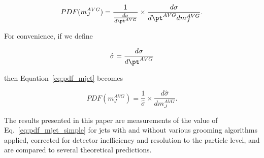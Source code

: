 \begin{equation}
\label{eq:pdf_mjet}
PDF(m_J^{AVG}) = \frac{1}{\frac{d\sigma}{d\pt^{AVG}}} \times \frac{d\sigma}{d\pt^{AVG} dm_J^{AVG}}. 
\end{equation}

For convenience, if we define 

\begin{equation}
\hat{\sigma} = \frac{d\sigma}{d\pt^{AVG}}
\end{equation}

then Equation~\ref{eq:pdf_mjet} becomes

\begin{equation}
\label{eq:pdf_mjet_simple}
PDF(m_J^{AVG}) = \frac{1}{\hat{\sigma}} \times \frac{d\hat{\sigma}}{dm_J^{AVG}}. 
\end{equation}

The results presented in this paper are measurements
of the value of Eq.~\ref{eq:pdf_mjet_simple} for 
jets with and without various grooming algorithms applied, 
corrected for detector inefficiency and resolution to the
particle level, and are compared to several theoretical
predictions. 

